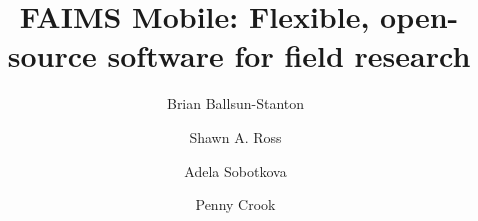 \documentclass[preprint,12pt, a4paper]{elsarticle}
\begin{document}
\begin{frontmatter}



\title{FAIMS Mobile: Flexible, open-source software for field research}



\author[ahis]{Brian Ballsun-Stanton~}


\author[mhis]{Shawn A. Ross~}

\author[ahis]{Adela Sobotkova~}

\author[latrobe]{Penny Crook~}

\address[ahis]{Department of Ancient History, Macquarie University, Sydney, Australia}
\address[mhis]{Big History Institute, Department of Modern History, Politics, and International Relations, and Department of Ancient History, Macquarie University, Sydney, Australia}
\address[latrobe]{Department of Archaeology, La Trobe University, Melbourne, Australia}






\end{frontmatter}
\end{document}
